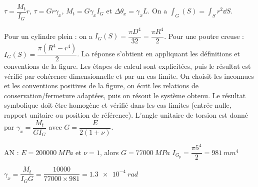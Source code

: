 \begin{corrigebox}
$\tau = \dfrac{M_t}{I_G}r$, $\tau = G r \gamma_x$, $M_t= G \gamma_x I_G$ et $\Delta \theta_x = \gamma_x L$.
On a $\int_G(S)=\int_S r^2 \dd S$.

Pour un cylindre plein : on a $I_G(S)=\dfrac{\pi D^4}{32} = \dfrac{\pi R^4}{2}$.
Pour une poutre creuse : $I_G(S) = \dfrac{\pi \left(R^4 -r^4\right) }{2} $.
La réponse s'obtient en appliquant les définitions et conventions de la
    figure. Les étapes de calcul sont explicitées, puis le résultat est vérifié par
    cohérence dimensionnelle et par un cas limite.
On choisit les inconnues et les conventions positives de la figure,
        on écrit les relations de conservation/fermeture adaptées, puis on résout le
        système obtenu. Le résultat symbolique doit être homogène et vérifié dans les cas
        limites (entrée nulle, rapport unitaire ou position de référence).
L'angle unitaire de torsion est donné par $\gamma_x = \dfrac{M_t }{GI_G}$ avec $G=\dfrac{E}{2(1+\nu)}$.

AN : 
$E = \SI{200 000}{MPa}$ et $\nu = 1$, alors $G = \SI{77 000}{MPa}$
$I_{G_p} = \dfrac{\pi 5^4}{2} = \SI{981}{mm^4}$ 

$\gamma_x = \dfrac{M_t }{I_G G} = \dfrac{10 000}{77 000\times 981} = \SI{1,3e-4}{rad}$
\end{corrigebox}

